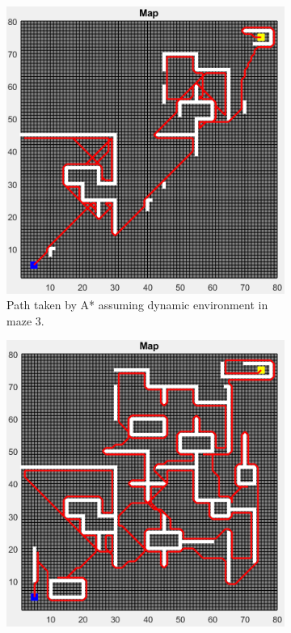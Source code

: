 \begin{figure}
	\centering
    \begin{subfigure}[t]{0.32\columnwidth}
		\centering
		\includegraphics[width=\textwidth]{images/a_star_dynamic_maze_3.png}
		\caption{Path taken by A* assuming dynamic environment in maze 3.}
        \label{fig:a_star_dynamic_path_maze_3}
	\end{subfigure}
    \hfill
	\begin{subfigure}[t]{0.32\columnwidth}
		\centering
		\includegraphics[width=\textwidth]{images/dijkstra_dynamic_maze_3.png}

\end{subfigure}
\end{figure}
